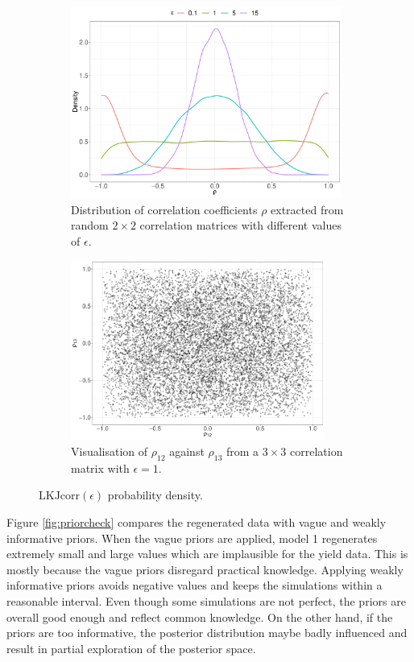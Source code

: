 \documentclass[a4paper]{article}   	%
\begin{document}
	\begin{figure}[!htp]
		\centering	
		\begin{subfigure}[t]{0.45\textwidth}
			\centering
			\includegraphics[height=6.3cm,width=\linewidth]{Images/LKJdensity}
			\caption{Distribution of correlation coefficients $\rho$ extracted from random $2\times2$ correlation matrices with different values of $\epsilon$.}
		\end{subfigure} 
		\space
		\begin{subfigure}[t]{0.45\textwidth}
			\centering
			\includegraphics[height=5.9cm,width=\linewidth]{Images/LKJdensity2D}
			\caption{Visualisation of $\rho_{12}$ against $\rho_{13}$ from a $3\times3$ correlation matrix with $\epsilon=1$.}
		\end{subfigure}
		\caption{$\text{LKJcorr}(\epsilon)$ probability density. }\label{fig:LKJdensity}
	\end{figure}
	
	
	
	
	Figure \ref{fig:priorcheck} compares the regenerated data with vague and weakly informative priors. When the vague priors are applied, model 1 regenerates extremely small and large values which are implausible for the yield data. This is mostly because the vague priors disregard practical knowledge. Applying weakly informative priors avoids negative values and keeps the simulations within a reasonable interval. Even though some simulations are not perfect, the priors are overall good enough and reflect common knowledge. On the other hand, if the priors are too informative, the posterior distribution maybe badly influenced and result in partial exploration of the posterior space. 
	
\end{document}
